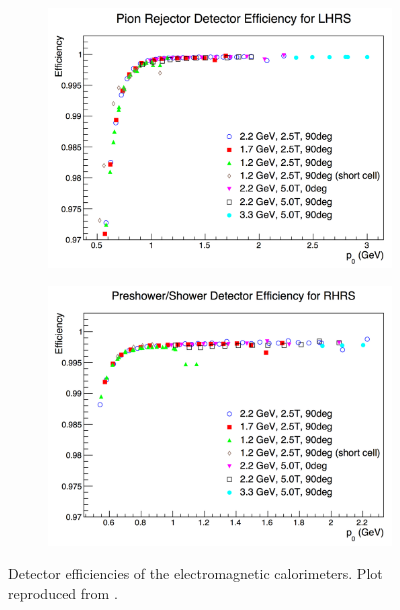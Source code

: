 \begin{figure}[tb!]
  \centering
  \begin{subfigure}[t]{0.49\textwidth}
    \includegraphics[width=\textwidth]{figs/calorimeters-efficiency-left.png}
  \end{subfigure}
  \begin{subfigure}[t]{0.49\textwidth}
    \includegraphics[width=\textwidth]{figs/calorimeters-efficiency-right.png}
  \end{subfigure}
  \caption[Detector efficiencies of the electromagnetic calorimeters.]{Detector efficiencies of the electromagnetic calorimeters. Plot reproduced from \cite{Cummings2013}. \label{C7S2F4}}
\end{figure}

